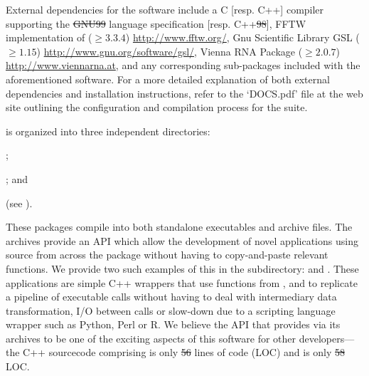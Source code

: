 \documentclass[11pt, oneside]{Thesis} %
\providecommand{\DIFadd}[1]{{\protect\color{blue}\uwave{#1}}} %
\providecommand{\DIFdel}[1]{{\protect\color{red}\sout{#1}}}                      %
\providecommand{\DIFaddbegin}{} %
\providecommand{\DIFaddend}{} %
\providecommand{\DIFdelbegin}{} %
\providecommand{\DIFdelend}{} %
\begin{document}
External dependencies for the software include a C [resp. C++]
compiler supporting the \DIFdelbegin \DIFdel{GNU99 }\DIFdelend \DIFaddbegin \DIFadd{GNU$99$ }\DIFaddend language specification [resp. C++\DIFdelbegin \DIFdel{98}\DIFdelend \DIFaddbegin \DIFadd{$98$}\DIFaddend ],
FFTW implementation of \fft \citep{fftw05} ($\geq
3.3.4$) \url{http://www.fftw.org/}, Gnu Scientific Library GSL ($\geq
1.15$) \url{http://www.gnu.org/software/gsl/}, Vienna RNA Package
\citep{lorenz.amb11} ($\geq 2.0.7$) \url{http://www.viennarna.at}, and
any corresponding sub-packages included with the aforementioned
software. For a more detailed explanation of both external
dependencies and installation instructions, refer to the
`DOCS.pdf' file at the web site
outlining the configuration and compilation process for the \hermes
suite.

\hermes is organized into three independent directories:
\begin{inparaenum}[\em 1\upshape)]
\item \ffttwo; \item \rnamfpt; and \item \rnaeq (see
).
\end{inparaenum}
These packages compile into both
standalone executables and archive files. The archives provide an
API which allow the development of novel applications using source
from across the \hermes package without having to copy-and-paste
relevant functions. We provide two such examples of this in the
 subdirectory: \fftmfpt and \ffteq. These applications
are simple C++ wrappers that use functions from \ffttwo, \rnamfpt and
\rnaeq to replicate a pipeline of executable calls without having to
deal with intermediary data transformation, I/O between calls or
slow-down due to a scripting language wrapper such as Python, Perl or R.
We believe
the API that \hermes provides via its archives to be one of the exciting
aspects of this software for other developers---the C++ sourcecode comprising
\fftmfpt is only \DIFdelbegin \DIFdel{56 }\DIFdelend \DIFaddbegin \DIFadd{$56$ }\DIFaddend lines of code (LOC) and \ffteq is only \DIFdelbegin \DIFdel{58 }\DIFdelend \DIFaddbegin \DIFadd{$58$ }\DIFaddend LOC.
\end{document}
